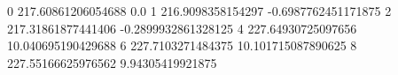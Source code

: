 0 217.60861206054688 0.0
1 216.9098358154297 -0.6987762451171875
2 217.31861877441406 -0.2899932861328125
4 227.64930725097656 10.040695190429688
6 227.7103271484375 10.101715087890625
8 227.55166625976562 9.94305419921875
